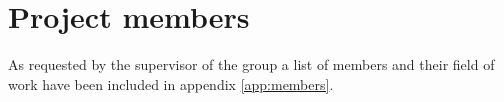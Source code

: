 \section{Project members}
As requested by the supervisor of the group a list of members and their field of work have been included in appendix \ref{app:members}.